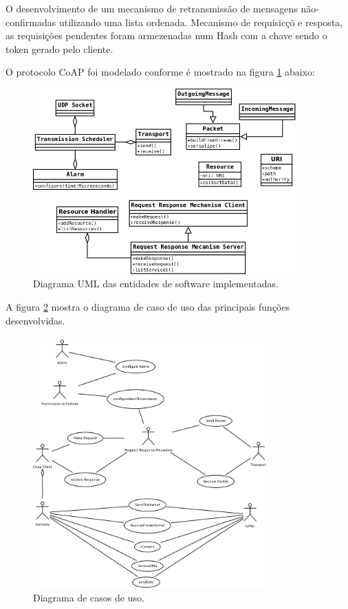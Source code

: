 O desenvolvimento de um mecanismo de retransmiss\~ao de mensagens n\~ao-confirmadas utilizando uma lista ordenada. Mecanismo de requisic\c{c}\~o e resposta, as requisi\c{c}\~oes pendentes foram armezenadas num Hash com a chave sendo o token gerado pelo cliente.

O protocolo CoAP foi modelado conforme \'e mostrado na figura \ref{uml} abaixo:
\begin{figure}[h]
   \label{uml}
   \centering
   \includegraphics[width=0.9\textwidth]{figuras/uml.png}
   \caption{Diagrama UML das entidades de software implementadas.}
\end{figure}

A figura \ref{casodeuso} mostra o diagrama de caso de uso das principais fun\c{c}\~oes desenvolvidas.
\begin{figure}[h]
   \label{casodeuso}
   \centering
   \includegraphics[width=0.8\textwidth]{figuras/casodeuso.png}
   \caption{Diagrama de casos de uso.}
\end{figure}

